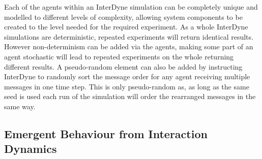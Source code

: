 \documentclass{article}
\begin{document}
Each of the agents within an InterDyne simulation can be completely unique and modelled to different levels of complexity, allowing system components to be created to the level needed for the required experiment. As a whole InterDyne simulations are deterministic, repeated experiments will return identical results. However non-determinism can be added via the agents, making some part of an agent stochastic will lead to repeated experiments on the whole returning different results. A pseudo-random element can also be added by instructing InterDyne to randomly sort the message order for any agent receiving multiple messages in one time step. This is only pseudo-random as, as long as the same seed is used each run of the simulation will order the rearranged messages in the same way.   




\subsection{Emergent Behaviour from Interaction Dynamics}
\end{document}
